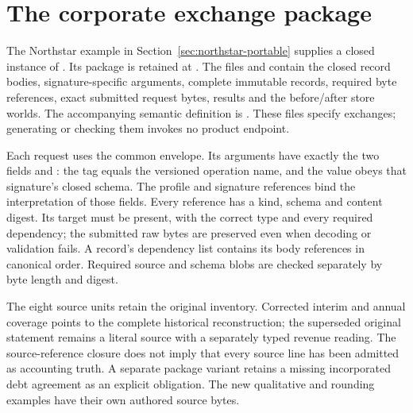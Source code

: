 \section{The corporate exchange package}
\label{sec:corporate-exchange-reference}

The Northstar example in Section~\ref{sec:northstar-portable} supplies a closed
instance of . Its package is retained at
. The files
 and  contain the closed
record bodies, signature-specific arguments, complete immutable records,
required byte references, exact submitted request bytes, results and the
before/after store worlds. The accompanying semantic definition is
.
These files specify exchanges; generating or checking them invokes no product
endpoint.

Each request uses the common envelope. Its arguments have exactly the two
fields  and : the tag equals the versioned operation name,
and the value obeys that signature's closed schema. The profile and signature
references bind the interpretation of those fields. Every reference has a kind,
schema and content digest. Its target must be present, with the correct type
and every required dependency; the submitted raw bytes are preserved even when
decoding or validation fails. A record's dependency list contains its body
references in canonical order. Required source and schema blobs are checked
separately by byte length and digest.

The eight source units retain the original inventory. Corrected interim and
annual coverage points to the complete historical reconstruction; the
superseded original statement remains a literal source with a separately typed
revenue reading. The source-reference closure does not imply that every source
line has been admitted as accounting truth. A separate package variant retains
a missing incorporated debt agreement as an explicit obligation. The new
qualitative and rounding examples have their own authored source bytes.

